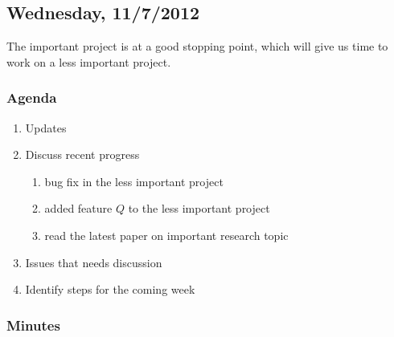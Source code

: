 \subsection{Wednesday, 11/7/2012}

The important project is at a good stopping point, which will give us time
to work on a less important project.

\subsubsection{Agenda}

\begin{enumerate}

    \item Updates

    \item Discuss recent progress

        \begin{enumerate}

            \item bug fix in the less important project

            \item added feature $Q$ to the less important project

            \item read the latest paper on important research topic

        \end{enumerate}

    \item Issues that needs discussion

    \item Identify steps for the coming week

\end{enumerate}

\subsubsection{Minutes}

